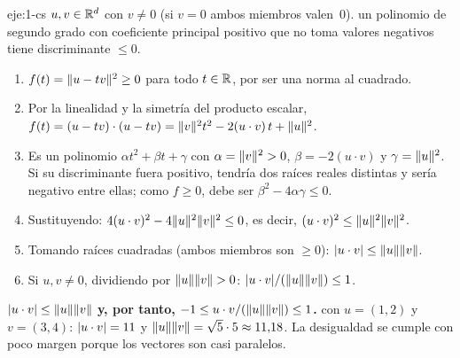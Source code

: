 \begin{solucion}{eje:1-cs}
\datos $u,v\in\mathbb{R}^{d}$ con $v\neq 0$ (si $v=0$ ambos miembros valen~0).
\planteamiento un polinomio de segundo grado con coeficiente principal positivo que no toma valores negativos tiene discriminante $\le 0$.
\pasos
\begin{enumerate}[label=\arabic*.]
  \item $f(t)=\lVert u-tv\rVert^{2}\ge 0$ para todo $t\in\mathbb{R}$, por ser una norma al cuadrado.
  \item Por la linealidad y la simetría del producto escalar, $f(t)=(u-tv)\cdot(u-tv)=\lVert v\rVert^{2}t^{2}-2(u\cdot v)\,t+\lVert u\rVert^{2}$.
  \item Es un polinomio $\alpha t^{2}+\beta t+\gamma$ con $\alpha=\lVert v\rVert^{2}>0$, $\beta=-2(u\cdot v)$ y $\gamma=\lVert u\rVert^{2}$. Si su discriminante fuera positivo, tendría dos raíces reales distintas y sería negativo entre ellas; como $f\ge 0$, debe ser $\beta^{2}-4\alpha\gamma\le 0$.
  \item Sustituyendo: $4(u\cdot v)^{2}-4\lVert u\rVert^{2}\lVert v\rVert^{2}\le 0$, es decir, $(u\cdot v)^{2}\le\lVert u\rVert^{2}\lVert v\rVert^{2}$.
  \item Tomando raíces cuadradas (ambos miembros son $\ge 0$): $\lvert u\cdot v\rvert\le\lVert u\rVert\lVert v\rVert$.
  \item Si $u,v\neq 0$, dividiendo por $\lVert u\rVert\lVert v\rVert>0$: $\lvert u\cdot v\rvert/(\lVert u\rVert\lVert v\rVert)\le 1$.
\end{enumerate}
\resultado \textbf{$\lvert u\cdot v\rvert\le\lVert u\rVert\lVert v\rVert$ y, por tanto, $-1\le u\cdot v/(\lVert u\rVert\lVert v\rVert)\le 1$.}
\comprobacion con $u=(1,2)$ y $v=(3,4)$: $\lvert u\cdot v\rvert=11$ y $\lVert u\rVert\lVert v\rVert=\sqrt5\cdot 5\approx 11{,}18$. La desigualdad se cumple con poco margen porque los vectores son casi paralelos.
\end{solucion}


